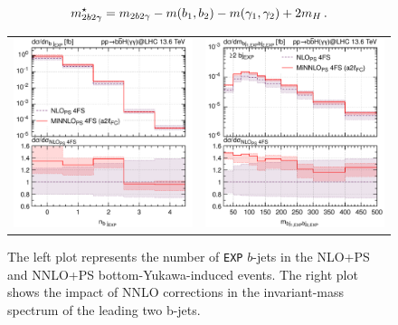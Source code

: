 \documentclass[11pt,a4paper]{article}
\begin{document}
\begin{equation}
\label{eq:mbbggs}
    m_{2b2\gamma}^{\star} = m_{2b2\gamma} - m(b_1,b_2) - m(\gamma_1,\gamma_2) + 2m_H \,.
\end{equation}

\begin{figure}[t!]
\begin{center}
\begin{tabular}{cc}
\includegraphics[width=.45\textwidth, page=1]{plots/4fs/n_b_jets-EXP.pdf}&
\includegraphics[width=.45\textwidth, page=1]{plots/4fs/m_bb-EXP-2bjet.pdf}
\end{tabular}
\vspace*{1ex}
\caption{The left plot represents the number of \texttt{EXP} $b$-jets in the NLO+PS and NNLO+PS bottom-Yukawa-induced events. The right plot shows the impact of NNLO corrections in the invariant-mass spectrum of the leading two b-jets.\label{fig:4fsMBB}}
\end{center}
\end{figure}
\end{document}
